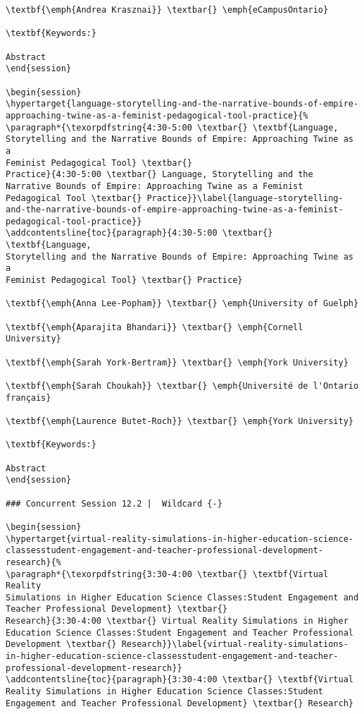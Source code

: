 \documentclass[
]{book}
\begin{document}
\begin{verbatim}
\textbf{\emph{Andrea Krasznai}} \textbar{} \emph{eCampusOntario}

\textbf{Keywords:}

Abstract
\end{session}

\begin{session}
\hypertarget{language-storytelling-and-the-narrative-bounds-of-empire-approaching-twine-as-a-feminist-pedagogical-tool-practice}{%
\paragraph*{\texorpdfstring{4:30-5:00 \textbar{} \textbf{Language,
Storytelling and the Narrative Bounds of Empire: Approaching Twine as a
Feminist Pedagogical Tool} \textbar{}
Practice}{4:30-5:00 \textbar{} Language, Storytelling and the Narrative Bounds of Empire: Approaching Twine as a Feminist Pedagogical Tool \textbar{} Practice}}\label{language-storytelling-and-the-narrative-bounds-of-empire-approaching-twine-as-a-feminist-pedagogical-tool-practice}}
\addcontentsline{toc}{paragraph}{4:30-5:00 \textbar{} \textbf{Language,
Storytelling and the Narrative Bounds of Empire: Approaching Twine as a
Feminist Pedagogical Tool} \textbar{} Practice}

\textbf{\emph{Anna Lee-Popham}} \textbar{} \emph{University of Guelph}

\textbf{\emph{Aparajita Bhandari}} \textbar{} \emph{Cornell University}

\textbf{\emph{Sarah York-Bertram}} \textbar{} \emph{York University}

\textbf{\emph{Sarah Choukah}} \textbar{} \emph{Université de l'Ontario
français}

\textbf{\emph{Laurence Butet-Roch}} \textbar{} \emph{York University}

\textbf{Keywords:}

Abstract
\end{session}

### Concurrent Session 12.2 |  Wildcard {-}

\begin{session}
\hypertarget{virtual-reality-simulations-in-higher-education-science-classesstudent-engagement-and-teacher-professional-development-research}{%
\paragraph*{\texorpdfstring{3:30-4:00 \textbar{} \textbf{Virtual Reality
Simulations in Higher Education Science Classes:Student Engagement and
Teacher Professional Development} \textbar{}
Research}{3:30-4:00 \textbar{} Virtual Reality Simulations in Higher Education Science Classes:Student Engagement and Teacher Professional Development \textbar{} Research}}\label{virtual-reality-simulations-in-higher-education-science-classesstudent-engagement-and-teacher-professional-development-research}}
\addcontentsline{toc}{paragraph}{3:30-4:00 \textbar{} \textbf{Virtual
Reality Simulations in Higher Education Science Classes:Student
Engagement and Teacher Professional Development} \textbar{} Research}


\end{verbatim}
\end{document}
